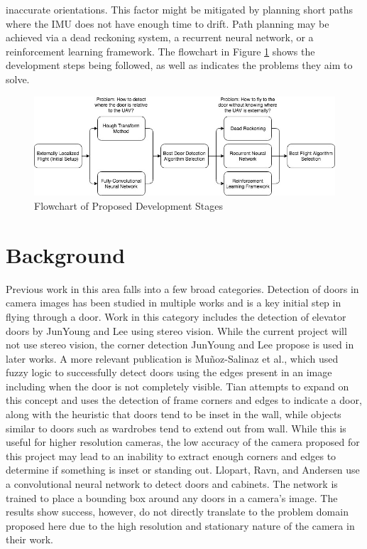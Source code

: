 \documentclass[12pt]{article}
\begin{document}
inaccurate orientations. This factor might be mitigated by planning short paths where the IMU does not have enough time to drift. Path planning may be achieved via a dead reckoning system, a recurrent neural network, or a reinforcement learning framework. The flowchart in Figure \ref{flowchart} shows the development steps being followed, as well as indicates the problems they aim to solve.

\begin{figure}
	\centering
	\includegraphics[scale=.55]{flowchart}
	\vspace{10pt}
	\caption[Flowchart of Proposed Development Stages]{Flowchart of Proposed Development Stages}
	\label{flowchart}
\end{figure}

\section{Background}
Previous work in this area falls into a few broad categories. Detection of doors in camera images has been studied in multiple works and is a key initial step in flying through a door. Work in this category includes the detection of elevator doors by JunYoung and Lee \cite{ElevatorDoors} using stereo vision. While the current project will not use stereo vision, the corner detection JunYoung and Lee propose is used in later works. A more relevant publication is Mu\~noz-Salinaz et al.\cite{Fuzzy}, which used fuzzy logic to successfully detect doors using the edges present in an image including when the door is not completely visible. Tian \cite{Tian2013} attempts to expand on this concept and uses the detection of frame corners and edges to indicate a door, along with the heuristic that doors tend to be inset in the wall, while objects similar to doors such as wardrobes tend to extend out from wall. While this is useful for higher resolution cameras, the low accuracy of the camera proposed for this project may lead to an inability to extract enough corners and edges to determine if something is inset or standing out. Llopart, Ravn, and Andersen\cite{NNDoor} use a convolutional neural network to detect doors and cabinets. The network is trained to place a bounding box around any doors in a camera's image. The results show success, however, do not directly translate to the problem domain proposed here due to the high resolution and stationary nature of the camera in their work.
\end{document}
